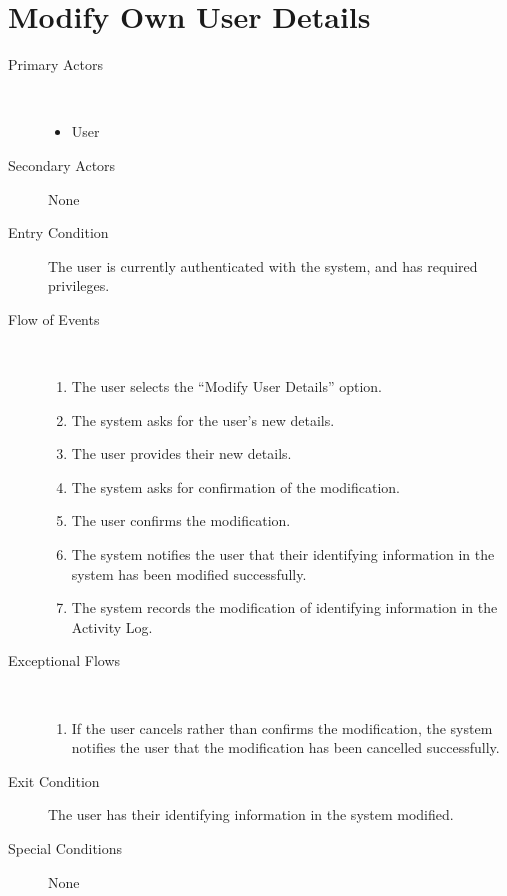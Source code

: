 \documentclass[a4paper,10pt]{report}
\begin{document}
\section{Modify Own User Details}
\begin{description}
\item[Primary Actors] \
  \begin{itemize}
  \item User
  \end{itemize}
\item[Secondary Actors] None
\item[Entry Condition]
  The user is currently authenticated with the system, and has required privileges.
\item[Flow of Events] \
  \begin{enumerate}
  \item The user selects the ``Modify User Details'' option.
  \item The system asks for the user's new details.
  \item The user provides their new details.
  \item The system asks for confirmation of the modification.
  \item The user confirms the modification.
  \item The system notifies the user that their identifying information in the system has been modified successfully.
    \item The system records the modification of identifying information in the Activity Log.
  \end{enumerate}
\item[Exceptional Flows] \
  \begin{enumerate}
  \item If the user cancels rather than confirms the modification, the system notifies the user that the modification has been cancelled successfully.
  \end{enumerate}
\item[Exit Condition]
  The user has their identifying information in the system modified.
\item[Special Conditions] None
\end{description}
\end{document}
